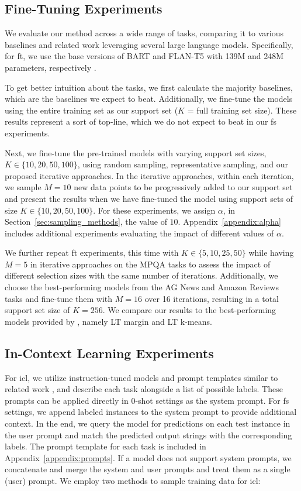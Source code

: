 \documentclass[11pt]{article}
\theoremstyle{definition}
\begin{document}
\subsection{Fine-Tuning Experiments}

We evaluate our method across a wide range of tasks, comparing it to various baselines and related work leveraging several large language models. Specifically, for \gls*{ft}, we use the base versions of BART and FLAN-T5 with 139M and 248M parameters, respectively \cite{lewis2019bart, chung2022scaling}.

To get better intuition about the tasks, we first calculate the majority baselines, which are the baselines we expect to beat. Additionally, we fine-tune the models using the entire training set as our support set ($K$ = full training set size). These results represent a sort of top-line, which we do not expect to beat in our \gls*{fs} experiments.

Next, we fine-tune the pre-trained models with varying support set sizes, $K \in \{10, 20, 50, 100\}$, using random sampling, representative sampling,
and our proposed iterative approaches. In the iterative approaches, within each iteration, we sample $M=10$ new data points to be progressively added to our support set and present the results when we have fine-tuned the model using support sets of size $K \in \{10, 20, 50, 100\}$. 
For these experiments, we assign $\alpha$, in Section~\ref{sec:sampling_methods}, the value of $10$. Appendix~\ref{appendix:alpha} includes additional experiments evaluating the impact of different values of $\alpha$.

We further repeat \gls*{ft} experiments, this time with $K \in \{5, 10, 25, 50\}$ while having $M=5$ in iterative approaches on the MPQA tasks to assess the impact of different selection sizes with the same number of iterations.
Additionally, we choose the best-performing models from the AG News and Amazon Reviews tasks and fine-tune them with $M=16$ over 16 iterations, resulting in a total support set size of $K=256$. We compare our results to the best-performing models provided by \citet{muller2022active}, namely LT margin and LT k-means.


\subsection{In-Context Learning Experiments}

For \gls*{icl}, we utilize instruction-tuned models and prompt templates similar to related work \cite{reid2024gemini, dubey2024llama}, and describe each task alongside a list of possible labels. These prompts can be applied directly in 0-shot settings as the system prompt. For \gls*{fs} settings, we append labeled instances to the system prompt to provide additional context. In the end, we query the model for predictions on each test instance in the user prompt and match the predicted output strings with the corresponding labels. 
The prompt template for each task is included in Appendix~\ref{appendix:prompts}.
If a model does not support system prompts, we concatenate and merge the system and user prompts and treat them as a single (user) prompt.
We employ two methods to sample training data for \gls*{icl}:
\end{document}
